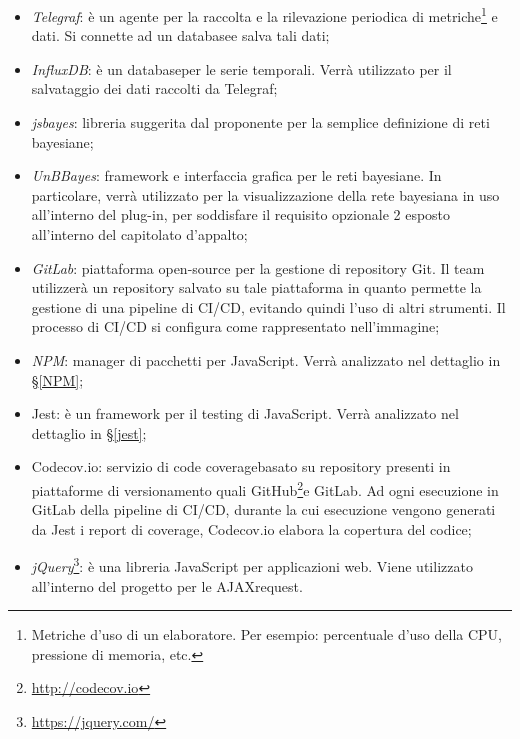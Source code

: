 \begin{itemize} 
	\item \textit{Telegraf}\glossario: è un agente per la raccolta e la rilevazione periodica di metriche\footnote{Metriche d'uso di un elaboratore. Per esempio: percentuale d'uso della CPU, pressione di memoria, etc.} e dati. Si connette ad un database\glossario e salva tali dati;
	\item \textit{InfluxDB}\glossario: è un database\glossario per le serie temporali. Verrà utilizzato per il salvataggio dei dati raccolti da Telegraf;
	\item \textit{jsbayes}\glossario: libreria suggerita dal proponente per la semplice definizione di reti bayesiane; 
	\item \textit{UnBBayes}\glossario: framework e interfaccia grafica per le reti bayesiane. In particolare, verrà utilizzato per la visualizzazione della rete bayesiana in uso all'interno del plug-in, per soddisfare il requisito opzionale 2 esposto all'interno del capitolato d'appalto;
	\item \textit{GitLab}\glossario: piattaforma open-source per la gestione di repository Git. Il team utilizzerà un repository salvato su tale piattaforma in quanto permette la gestione di una pipeline di CI/CD\glossario, evitando quindi l'uso di altri strumenti. Il processo di CI/CD si configura come rappresentato nell'immagine;
	\item \textit{NPM}\glossario: manager di pacchetti per JavaScript. Verrà analizzato nel dettaglio in §\ref{NPM};
	\item Jest\glossario: è un framework per il testing di JavaScript. Verrà analizzato nel dettaglio in §\ref{jest};
	\item Codecov.io: servizio di code coverage\glossario basato su repository presenti in piattaforme di versionamento quali GitHub\footnote{\url{http://codecov.io}}\glossario e GitLab. Ad ogni esecuzione in GitLab della pipeline di CI/CD, durante la cui esecuzione vengono generati da Jest i report di coverage, Codecov.io elabora la copertura del codice;
	\item \textit{jQuery}\glossario\footnote{\url{https://jquery.com/}}: è una libreria JavaScript per applicazioni web. Viene utilizzato all'interno del progetto per le  AJAX\glossario request.
\end{itemize}

